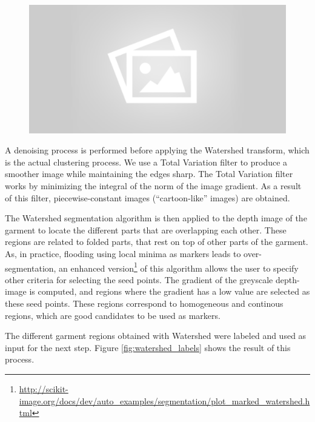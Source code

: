 \begin{figure}[thpb]
    \centering
    \includegraphics[width=0.7
    \textwidth]{figures/placeholder2.png}
    \caption{}
    \label{fig:watershed_example}
\end{figure}

A denoising process is performed before applying the Watershed transform, which is the actual clustering process. We use a Total Variation filter  to produce a smoother image while maintaining the edges sharp. The Total Variation filter works by minimizing the integral of the norm of the image gradient. As a result of this filter, piecewise-constant images (``cartoon-like'' images) are obtained.

The Watershed segmentation algorithm is then applied to the depth image of the garment to locate the different parts that are overlapping each other. These regions are related to folded parts, that rest on top of other parts of the garment. 
%
As, in practice, flooding using local minima as markers  leads to over-segmentation, an enhanced version\footnote{\url{http://scikit-image.org/docs/dev/auto_examples/segmentation/plot_marked_watershed.html}} of this algorithm  allows the user to specify other criteria for selecting the seed points. The gradient of the greyscale depth-image is computed, and regions where the gradient has a low value are selected as these seed points. These regions correspond to homogeneous and continous regions, which are good candidates to be used as markers.

The different garment regions obtained with Watershed were labeled and used as input for the next step. Figure \ref{fig:watershed_labels} shows the result of this process.

